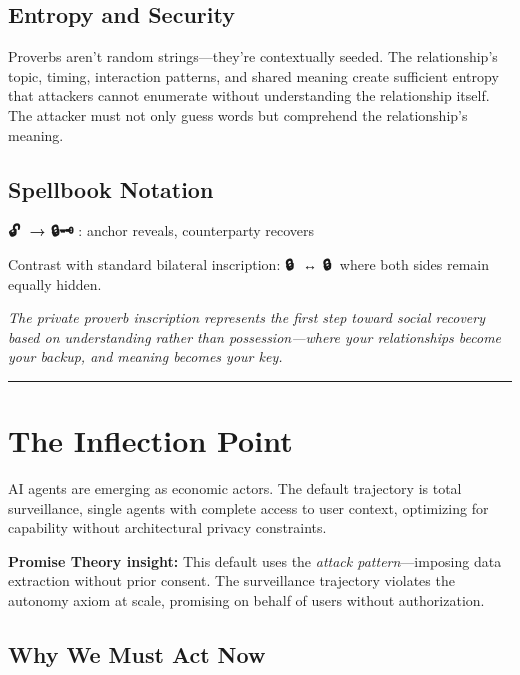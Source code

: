 \documentclass[
]{article}
\begin{document}
\subsection{Entropy and Security}\label{entropy-and-security}

Proverbs aren't random strings---they're contextually seeded. The
relationship's topic, timing, interaction patterns, and shared meaning
create sufficient entropy that attackers cannot enumerate without
understanding the relationship itself. The attacker must not only guess
words but comprehend the relationship's meaning.

\subsection{Spellbook Notation}\label{spellbook-notation}

\textbf{🔓📝 → 🔒🗝️} : anchor reveals, counterparty recovers

Contrast with standard bilateral inscription: \textbf{🔒📝 ↔ 🔒📝} where
both sides remain equally hidden.

\emph{The private proverb inscription represents the first step toward
social recovery based on understanding rather than possession---where
your relationships become your backup, and meaning becomes your key.}

\begin{center}\rule{0.5\linewidth}{0.5pt}\end{center}

\section{The Inflection Point}\label{the-inflection-point}

AI agents are emerging as economic actors. The default trajectory is
total surveillance, single agents with complete access to user context,
optimizing for capability without architectural privacy constraints.

\textbf{Promise Theory insight:} This default uses the \emph{attack
pattern}---imposing data extraction without prior consent. The
surveillance trajectory violates the autonomy axiom at scale, promising
on behalf of users without authorization.

\subsection{Why We Must Act Now}\label{why-we-must-act-now}
\end{document}
